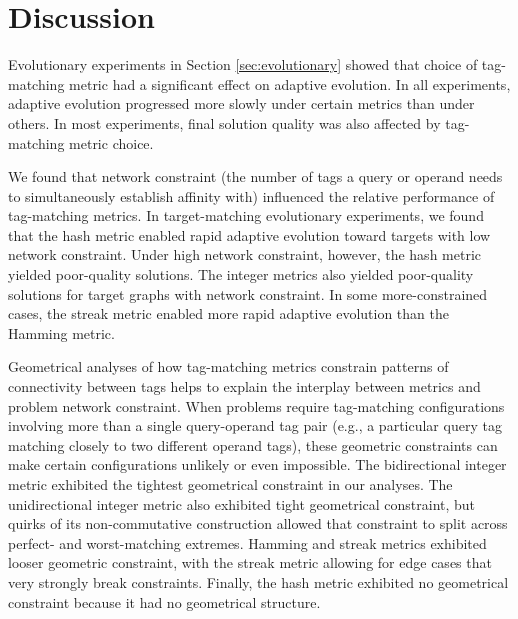 \section{Discussion}


% 

Evolutionary experiments in Section \ref{sec:evolutionary} showed that choice of tag-matching metric had a significant effect on adaptive evolution.
In all experiments, adaptive evolution progressed more slowly under certain metrics than under others.
In most experiments, final solution quality was also affected by tag-matching metric choice.

We found that network constraint (the number of tags a query or operand needs to simultaneously establish affinity with) influenced the relative performance of tag-matching metrics.
In target-matching evolutionary experiments, we found that the hash metric enabled rapid adaptive evolution toward targets with low network constraint.
Under high network constraint, however, the hash metric yielded poor-quality solutions.
The integer metrics also yielded poor-quality solutions for target graphs with network constraint.
In some more-constrained cases, the streak metric enabled more rapid adaptive evolution than the Hamming metric.

Geometrical analyses of how tag-matching metrics constrain patterns of connectivity between tags helps to explain the interplay between metrics and problem network constraint.
When problems require tag-matching configurations involving more than a single query-operand tag pair (e.g., a particular query tag matching closely to two different operand tags), these geometric constraints can make certain configurations unlikely or even impossible.
The bidirectional integer metric exhibited the tightest geometrical constraint in our analyses.
The unidirectional integer metric also exhibited tight geometrical constraint, but quirks of its non-commutative construction allowed that constraint to split across perfect- and worst-matching extremes.
Hamming and streak metrics exhibited looser geometric constraint, with the streak metric allowing for edge cases that very strongly break constraints.
Finally, the hash metric exhibited no geometrical constraint because it had no geometrical structure.

